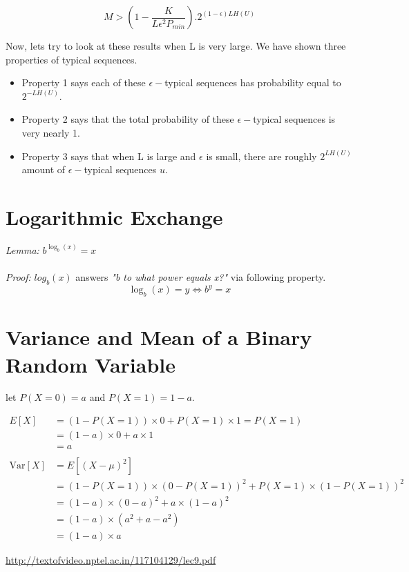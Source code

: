 \documentclass[11pt]{article}
\begin{document}
\begin{equation}
M > (1 - \frac{K}{L \epsilon^{2}P_{min}}) . 2 ^ {(1 - \epsilon)LH(U)}
\end{equation}

Now, lets try to look at these results when L is very large.  We have shown
three properties of typical sequences.

\begin{itemize}
\item Property 1 says each of these $\epsilon-$typical sequences has probability equal to $2^{-LH(U)}$.
\item Property 2 says that the total probability of these $\epsilon-$typical sequences is very nearly 1.
\item Property 3 says that when L is large and $\epsilon$ is small, there are roughly $2^{LH(U)}$ amount of $\epsilon-$typical sequences $u$.
\end{itemize}

\begin{appendices}
\section{Logarithmic Exchange}
\textit{Lemma:} $b^{\log_{b}(x)} = x$
\\ \\
\textit{Proof:} $log_{b}(x)$ answers \textit{"b to what power equals x?"} via following property.
\begin{equation}
\log_{b}(x) = y \Leftrightarrow b^{y} = x
\end{equation}
\section{Variance and Mean of a Binary Random Variable}

let $P(X=0) = a$ and $P(X=1) = 1 - a$.

\begin{equation} \label{mean_x}
\begin{split}
E[X] & = (1 - P(X=1)) \times 0 + P(X=1) \times 1 = P(X=1) \\
& = (1 - a) \times 0 + a \times 1 \\
& = a \\ \\
\mathrm{Var}[X] & = E[(X-\mu)^2] \\
& = (1 - P(X=1)) \times (0 - P(X=1))^2 + P(X=1) \times (1 - P(X=1))^2\\
& = (1 - a) \times (0 - a)^2 + a \times (1 - a)^2 \\
& = (1 - a) \times (a^2 +a - a^2) \\
& = (1 - a) \times a
\end{split}
\end{equation}

\end{appendices}


\begin{thebibliography}{99}


\url{http://textofvideo.nptel.ac.in/117104129/lec9.pdf}
\end{thebibliography}
\end{document}
